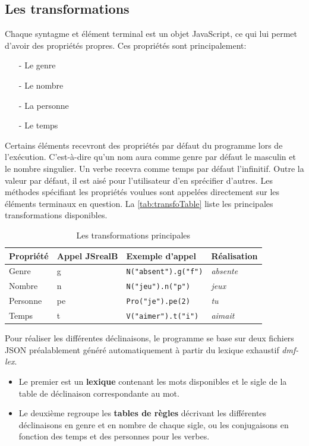 \documentclass[11pt]{article} %
\newcommand{\system}[1]{\textsf{#1}}
\newcommand{\JSB}{\system{JSrealB}}
\newcommand{\real}[1]{\emph{#1}}
\begin{document}
\subsection{Les transformations}

Chaque syntagme et élément terminal est un objet JavaScript, ce qui
lui permet d'avoir des propriétés propres. Ces propriétés sont principalement:
\begin{itemize}
\item[-] Le genre
\item[-] Le nombre
\item[-] La personne
\item[-] Le temps
\end{itemize}
Certains éléments recevront des propriétés par défaut du programme
lors de l'exécution. C'est-à-dire qu'un nom aura comme genre par défaut
le masculin et le nombre singulier. Un verbe recevra comme temps par
défaut l'infinitif. Outre la valeur par défaut, il est aisé pour
l'utilisateur d'en sprécifier d'autres. Les méthodes spécifiant les
propriétés voulues sont appelées directement sur les éléments terminaux
en question. La \autoref{tab:transfoTable} liste les principales transformations
disponibles.

\begin{table}
\centering
\caption{Les transformations principales}
\label{tab:transfoTable}
\begin{tabular}{|l|l|l|l|}
\hline 
Propriété & Appel \JSB{} & Exemple d'appel & Réalisation\tabularnewline
\hline 
\hline 
Genre & g & \texttt{N("absent").g("f")} & \real{absente}\tabularnewline
\hline 
Nombre & n & \texttt{N("jeu").n("p")} & \real{jeux}\tabularnewline
\hline 
Personne & pe & \texttt{Pro("je").pe(2)} & \real{tu}\tabularnewline
\hline 
Temps & t & \texttt{V("aimer").t("i")} & \real{aimait}\tabularnewline
\hline 
\end{tabular}
\end{table}


Pour réaliser les différentes déclinaisons, le programme se base sur
deux fichiers JSON préalablement généré automatiquement à partir du 
lexique exhaustif \emph{dmf-lex}. 
\begin{itemize}
\item Le premier
est un \textbf{lexique} contenant les mots disponibles et le sigle de la table
de déclinaison correspondante au mot. 
\item Le deuxième regroupe les \textbf{tables
de règles} décrivant les différentes déclinaisons en genre et en nombre
de chaque sigle, ou les conjugaisons en fonction des temps et des
personnes pour les verbes.
\end{itemize}
\end{document}
